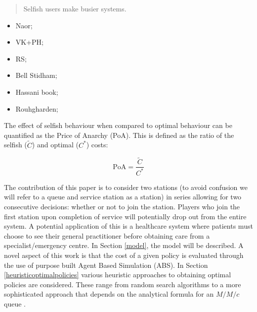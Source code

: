 \documentclass[12pt]{article}
\newcommand{\PoA}{\text{PoA}}
\begin{document}
\begin{quote}
Selfish users make busier systems.
\end{quote}

\begin{itemize}
    \item Naor;
    \item VK+PH;
    \item RS;
    \item Bell Stidham;
    \item Hassani book;
    \item Rouhgharden;
\end{itemize}

The effect of selfish behaviour when compared to optimal behaviour can be quantified as the Price of Anarchy (PoA).
This is defined as the ratio of the selfish ($\tilde C$) and optimal ($C^*$) costs:

$$
\PoA = \frac{\tilde C}{C^*}
$$

The contribution of this paper is to consider two stations (to avoid confusion we will refer to a queue and service station as a station) in series allowing for two consecutive decisions: whether or not to join the station.
Players who join the first station upon completion of service will potentially drop out from the entire system.
A potential application of this is a healthcare system where patients must choose to see their general practitioner before obtaining care from a specialist/emergency centre.
In Section \ref{model}, the model will be described.
A novel aspect of this work is that the cost of a given policy is evaluated through the use of purpose built Agent Based Simulation (ABS).
In Section \ref{heuristicoptimalpolicies} various heuristic approaches to obtaining optimal policies are considered.
These range from random search algorithms to a more sophisticated approach that depends on the analytical formula for an $M/M/c$ queue \cite{Stewart}.
\end{document}
